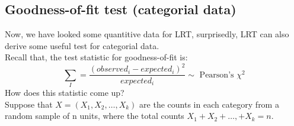 \documentclass[12pt ]{article}
\begin{document}
\subsection{Goodness-of-fit test (categorial data)}
Now, we have looked some quantitive data for LRT, surprisedly, LRT can also derive some useful test for categorial data. \\

Recall that, the test statistic for goodness-of-fit is:
\begin{equation*}
\sum_{I} = \frac{(observed_{i} - expected_{i})^2}{expected_{i}} \sim \text{ Pearson's $\chi^2$}
\end{equation*}
How does this statistic come up? \\

Suppose that $X = (X_{1}, X_{2}, \ldots, X_{k})$ are the counts in each category from a random sample of n units, where the total counts $X_{1} + X_{2} + \ldots, + X_{k} = n$.\\
\end{document}
